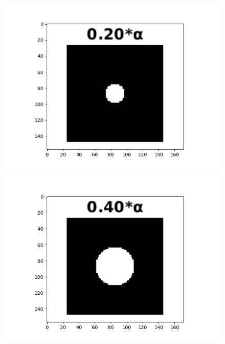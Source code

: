 \documentclass[12pt, a4paper]{article}
\begin{document}
\begin{figure}[h!]
    \centering
    \begin{minipage}[c][1\width]{0.19\textwidth}
    	\hspace*{-14pt}
    	\includegraphics[width=1.24\textwidth]{bird_kernel_0.20_cropped.png}
	    \label{fig:3.5(a)}
    \end{minipage}
    \begin{minipage}[c][1\width]{0.19\textwidth}
    	\hspace*{-14pt}
    	\includegraphics[width=1.24\textwidth]{bird_kernel_0.40_cropped.png}
	    \label{fig:3.5(a)}
    \end{minipage}
\renewcommand{\thefigure}{: bird}
    \begin{minipage}[c][1\width]{0.19\textwidth}

\end{minipage}
\end{figure}
\end{document}
